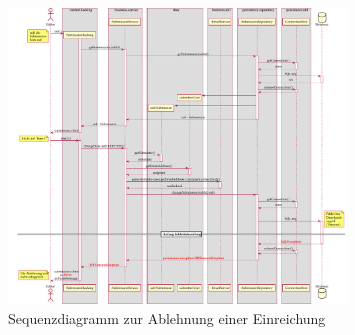 \begin{figure}[H]
    \centering
    \includegraphics[width=0.8\textwidth]{graphics/reject_submission}
    \caption{Sequenzdiagramm zur Ablehnung einer Einreichung}
    \label{fig:rejection-sequence}
\end{figure}
